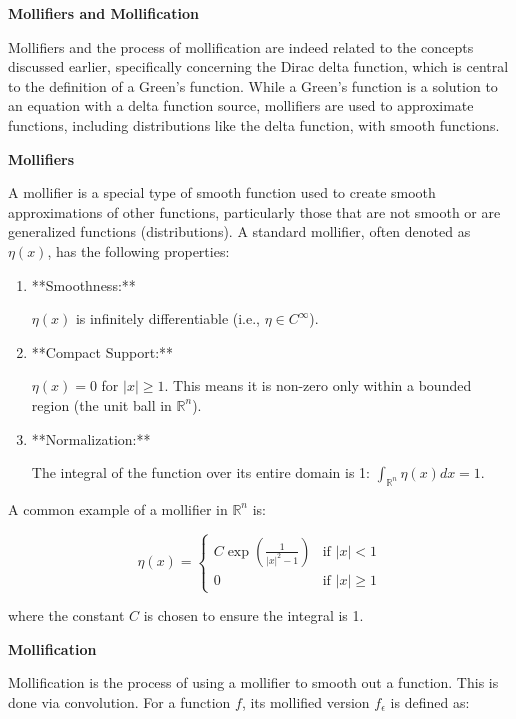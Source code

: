 \documentclass[12pt,a4paper]{report}
\begin{document}
{\newpage
\textbf{\Large{Mollifiers and Mollification}}

Mollifiers and the process of mollification are indeed related to the concepts discussed earlier, specifically concerning the Dirac delta function, which is central to the definition of a Green's function. While a Green's function is a solution to an equation with a delta function source, mollifiers are used to approximate functions, including distributions like the delta function, with smooth functions.

\begin{description}
\item \textbf{Mollifiers}

A mollifier is a special type of smooth function used to create smooth approximations of other functions, particularly those that are not smooth or are generalized functions (distributions). A standard mollifier, often denoted as \(\eta(x)\), has the following properties:

\begin{enumerate}

\item  **Smoothness:** 

\(\eta(x)\) is infinitely differentiable (i.e., \(\eta \in C^\infty\)).
\item **Compact Support:** 

\(\eta(x) = 0\) for \(|x| \ge 1\). This means it is non-zero only within a bounded region (the unit ball in \(\mathbb{R}^n\)).
\item **Normalization:** 

The integral of the function over its entire domain is 1: \(\int_{\mathbb{R}^n} \eta(x) dx = 1\).

\end{enumerate}
A common example of a mollifier in \(\mathbb{R}^n\) is:

\[ \eta(x) = \begin{cases} C \exp\left(\frac{1}{|x|^2 - 1}\right) & \text{if } |x| < 1 \\ 0 & \text{if } |x| \ge 1 \end{cases} \]

where the constant \(C\) is chosen to ensure the integral is 1.

\item \textbf{Mollification}

Mollification is the process of using a mollifier to smooth out a function. This is done via convolution. For a function \(f\), its mollified version \(f_\epsilon\) is defined as:


\end{description}}
\end{document}
